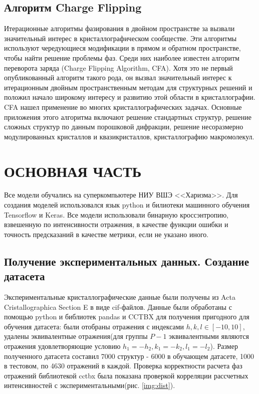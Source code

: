 \documentclass{article}
\begin{document}
\subsection{Алгоритм Charge Flipping}
Итерационные алгоритмы фазирования в двойном пространстве за вызвали значительный интерес в кристаллографическом сообществе. Эти алгоритмы используют чередующиеся модификации в прямом и обратном пространстве, чтобы найти решение проблемы фаз. Среди них наиболее известен алгоритм переворота заряда (Charge Flipping Algorithm, CFA)\cite{ChargeFlipping}. 
Хотя это не первый опубликованный алгоритм такого рода, он вызвал значительный интерес к итерационным двойным пространственным методам для структурных решений и положил начало широкому интересу и развитию этой области в кристаллографии.
CFA нашел применение во многих кристаллографических задачах. Основные приложения этого алгоритма включают решение стандартных структур, решение сложных структур по данным порошковой дифракции, решение несоразмерно модулированных кристаллов и квазикристаллов, кристаллографию макромолекул\cite{Palatinus2013}.

\newpage
\section{ОСНОВНАЯ ЧАСТЬ}
Все модели обучались на суперкомпьютере НИУ ВШЭ <<Харизма>>. Для создания моделей использовался язык python и билиотеки машинного обучения Tensorflow и Keras. Все модели использовали бинарную кроссэнтропию, взвешенную по интенсивности отражения, в качестве функции ошибки и точность предсказаний в качестве метрики, если не указано иного.
  
\subsection{Получение экспериментальных данных. Создание датасета}

Экспериментальные кристаллографические данные были получены из Acta Cristallographica Section E в виде cif-файлов. Данные были обработаны с помощью python и библиотек pandas и CCTBX для получения пригодного для обучения датасета: были отобраны отражения с индексами $h,k,l \in [-10, 10]$, удалены эквивалентные отражения(для группы $P-1$ эквивалентными являются отражения удовлетворяющие условию $h_1=-h_2, k_1=-k_2, l_1=-l_2$). Размер полученного датасета составил 7000 структур - 6000 в обучающем датасете, 1000 в тестовом, по 4630 отражений в каждой. Проверка корректности расчета фаз отражений библиотекой cctbx была показана проверкой корреляции рассчетных интенсивностей с экспериментальными(рис. \ref{img:dist}). 
\end{document}
